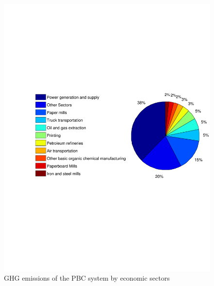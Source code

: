 \documentclass[conference]{IEEEtran}
\begin{document}

\begin{figure}[h]
\centering
\includegraphics[scale=0.45]{f.pdf}
\caption{GHG emissions of the PBC system by economic sectors}
\label{screecn3Sectors}
\end{figure}
\end{document}

